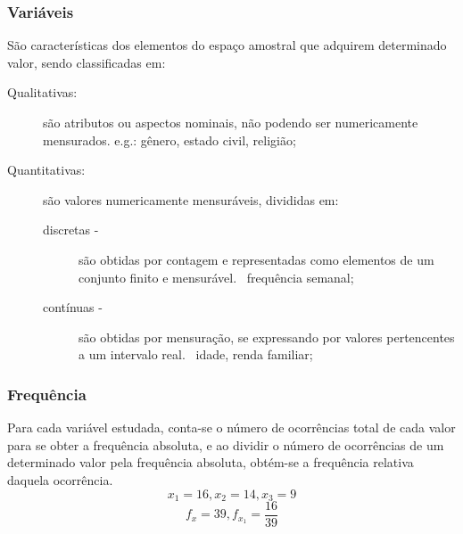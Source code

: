     \subsubsection{Variáveis}
        São características dos elementos do espaço amostral que adquirem determinado valor, sendo classificadas em:
        \begin{description}
            \item[Qualitativas:] são atributos ou aspectos nominais, não podendo ser numericamente mensurados. e.g.: gênero, estado civil, religião;
            \item[Quantitativas:] são valores numericamente mensuráveis, divididas em:
                \begin{description}
                    \item[discretas - ] são obtidas por contagem e representadas como elementos de um conjunto finito e mensurável. \eg \ frequência semanal;
                    \item[contínuas - ] são obtidas por mensuração, se expressando por valores pertencentes a um intervalo real. \eg \ idade, renda familiar;
                \end{description}
        \end{description}
    \subsubsection{Frequência}
        Para cada variável estudada, conta-se o número de ocorrências total de cada valor para se obter a frequência absoluta, e ao dividir o número de ocorrências de um determinado valor pela frequência absoluta, obtém-se a frequência relativa daquela ocorrência. \eg
        \[ x_1 = 16, x_2 = 14, x_3 = 9 \]
        \[ f_x = 39, f_{x_1} = \frac{16}{39} \]

